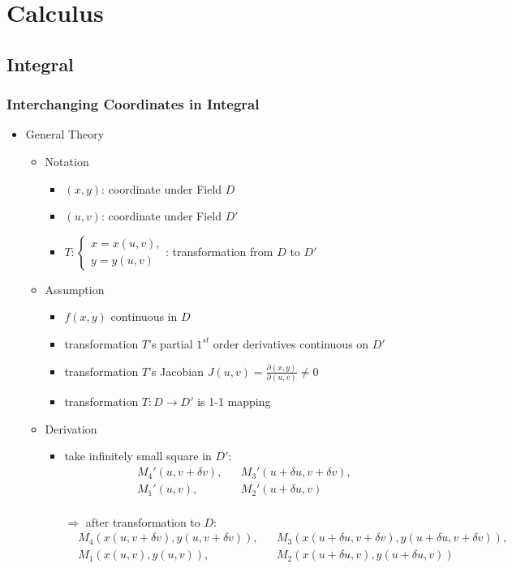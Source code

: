 \section{Calculus}

\subsection{Integral}
\subsubsection{Interchanging Coordinates in Integral}
\begin{itemize}
\item General Theory
	\begin{itemize}
	\item Notation
		\begin{itemize}
		\item $(x,y)$: coordinate under Field $D$
		\item $(u,v)$: coordinate under Field $D'$
		\item $\displaystyle T: \begin{cases} x=x(u,v), \\ y=y(u,v) \end{cases}$: transformation from $D$ to $D'$
		\end{itemize} 
	\item Assumption
		\begin{itemize}
		\item $f(x,y)$ continuous in $D$
		\item transformation $T$'s partial $1^{st}$ order derivatives continuous on $D'$
		\item transformation $T$'s Jacobian $J(u,v) = \frac {\partial (x,y)}{\partial (u,v)} \neq 0$
		\item transformation $T: D\rightarrow D'$ is 1-1 mapping
		\end{itemize}
	\item Derivation
		\begin{itemize}
		\item take infinitely small square in $D':$
		\begin{align*} &M_4'(u,v+\delta v),&&M_3'(u+\delta u, v+\delta v),\\&M_1'(u, v),&&M_2'(u+\delta u, v) \end{align*} \\
		$\Rightarrow$ after transformation to $D:$ 
		\begin{align*} 
		&M_4(x(u,v+\delta v),y(u,v+\delta v)),&&M_3(x(u+\delta u, v+\delta v),y(u+\delta u, v+\delta v)),\\&M_1(x(u, v),y(u, v)),&&M_2(x(u+\delta u, v),y(u+\delta u, v)) 

\end{align*}
\end{itemize}
\end{itemize}
\end{itemize}
